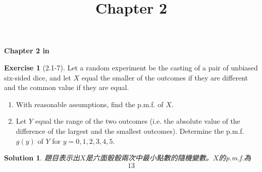 \documentclass[14pt]{article}
\newtheorem*{solution}{Solution}
\theoremstyle{definition}
\newtheorem*{exercise}{Exercise}
\theoremstyle{remark}
\numberwithin{equation}{section}
\numberwithin{theorem}{section}
\begin{document}
\setcounter{section}{0}
\title{Chapter 2}

\thispagestyle{empty}
\begin{center}
{\LARGE \bf Chapter 2 in \cite{Hog10}}
\end{center}

\begin{exercise}[2.1-7]
    Let a random experiment be the casting of a pair of unbiased six-sided dice, 
    and let $X$ equal the smaller of the outcomes if they are different and the common 
    value if they are equal.
    \begin{enumerate}
    \item With reasonable assumptions, find the p.m.f. of $X$.
    \item Let $Y$ equal the range of the two outcomes (i.e. the absolute value of the difference
     of the largest and the smallest outcomes). Determine the p.m.f. $g(y)$ of $Y$ for $y=0, 1, 2, 3, 4, 5$.
    \end{enumerate}
\end{exercise}

\begin{solution}
題目表示出$X$是六面骰骰兩次中最小點數的隨機變數。$X$的p.m.f.為
$$
13
$$
\end{solution}

\newpage


\nocite{*}
\end{document}
